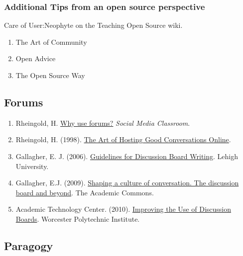 \hypertarget{additional-tips-from-an-open-source-perspective}{%
\subsubsection{Additional Tips from an open source
perspective}\label{additional-tips-from-an-open-source-perspective}}

Care of User:Neophyte on the Teaching Open Source wiki.

\begin{enumerate}
\def\labelenumi{\arabic{enumi}.}
\item
  The Art of Community
\item
  Open Advice
\item
  The Open Source Way
\end{enumerate}

\hypertarget{forums}{%
\subsection{Forums}\label{forums}}

\begin{enumerate}
\def\labelenumi{\arabic{enumi}.}
\item
  Rheingold, H. \href{http://blip.tv/file/1123048}{Why use forums?}
  \emph{Social Media Classroom}.
\item
  Rheingold, H. (1998).
  \href{http://www.rheingold.com/texts/artonlinehost.html}{The Art of
  Hosting Good Conversations Online}.
\item
  Gallagher, E. J. (2006).
  \href{http://www.lehigh.edu/~indiscus/doc_guidelines.html}{Guidelines
  for Discussion Board Writing}. Lehigh University.
\item
  Gallagher, E.J. (2009).
  \href{http://www.academiccommons.org/2009/01/shaping-a-culture-of-conversation-the-discussion-board-and-beyond/}{Shaping
  a culture of conversation. The discussion board and beyond}. The
  Academic Commons.
\item
  Academic Technology Center. (2010).
  \href{http://www.wpi.edu/Academics/ATC/Collaboratory/Idea/boards.html}{Improving
  the Use of Discussion Boards}. Worcester Polytechnic Institute.
\end{enumerate}

\hypertarget{paragogy}{%
\subsection{Paragogy}\label{paragogy}}

